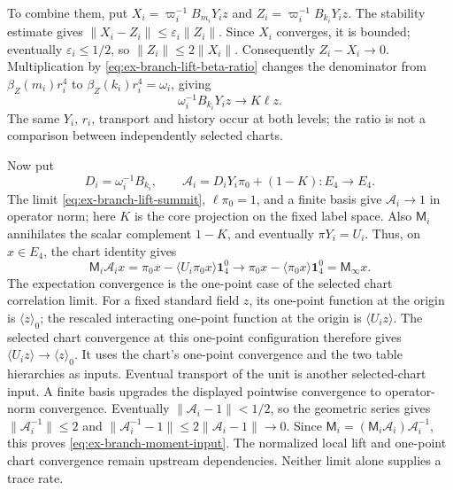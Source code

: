 To combine them, put $X_i=\varpi_i^{-1}B_{m_i}Y_i z$ and
$Z_i=\varpi_i^{-1}B_{k_i}Y_i z$. The stability estimate gives
$\|X_i-Z_i\|\le\varepsilon_i\|Z_i\|$. Since $X_i$ converges, it is
bounded; eventually $\varepsilon_i\le1/2$, so
$\|Z_i\|\le2\|X_i\|$. Consequently $Z_i-X_i\to0$. Multiplication by
\eqref{eq:ex-branch-lift-beta-ratio} changes the denominator from
$\beta_Z(m_i)r_i^4$ to $\beta_Z(k_i)r_i^4=\omega_i$, giving
\begin{equation}
 \omega_i^{-1}B_{k_i}Y_i z\longrightarrow K\ell z.
 \label{eq:ex-branch-lift-summit}
\end{equation}
The same $Y_i$, $r_i$, transport and history occur at both levels; the ratio is
not a comparison between independently selected charts.

Now put
\[
 D_i=\omega_i^{-1}B_{k_i},\qquad
 \mathcal A_i=D_iY_i\pi_0+(1-K):E_4\longrightarrow E_4.
\]
The limit \eqref{eq:ex-branch-lift-summit}, $\ell\pi_0=1$, and a finite
basis give $\mathcal A_i\to1$ in operator norm; here $K$ is the core projection on
the fixed label space. Also $\mathsf M_i$
annihilates the scalar complement $1-K$, and eventually
$\pi Y_i=U_i$. Thus, on $x\in E_4$, the chart identity gives
\[
 \mathsf M_i \mathcal A_i x
 =\pi_0x-\langle U_i\pi_0x\rangle\mathbf1_4^0
 \longrightarrow \pi_0x-\langle\pi_0x\rangle\mathbf1_4^0
 =\mathsf M_\infty x.
\]
The expectation convergence is the one-point case of the selected chart
correlation limit. For a fixed standard field $z$, its one-point function
at the origin is $\langle z\rangle_0$; the rescaled interacting one-point
function at the origin is $\langle U_i z\rangle$. The selected chart
convergence at this one-point configuration therefore gives
$\langle U_i z\rangle\to\langle z\rangle_0$. It uses the chart's
one-point convergence and the two table hierarchies as inputs. Eventual
transport of the unit is another selected-chart input. A finite basis
upgrades the displayed pointwise convergence to operator-norm convergence.
Eventually $\|\mathcal A_i-1\|<1/2$, so the geometric series gives
$\|\mathcal A_i^{-1}\|\le2$ and
$\|\mathcal A_i^{-1}-1\|\le2\|\mathcal A_i-1\|\to0$.
Since $\mathsf M_i=(\mathsf M_i\mathcal A_i)\mathcal A_i^{-1}$,
this proves \eqref{eq:ex-branch-moment-input}. The normalized local lift
and one-point chart convergence remain upstream dependencies. Neither limit alone
supplies a trace rate.

